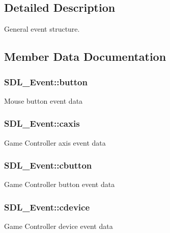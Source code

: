 \subsection{Detailed Description}
General event structure. 

\subsection{Member Data Documentation}
\hypertarget{unionSDL__Event_ab6da2fa2687e5f849f270adecc64785f}{}
\subsubsection[{button}]{ S\+D\+L\+\_\+\+Event\+::button}\label{unionSDL__Event_ab6da2fa2687e5f849f270adecc64785f}
Mouse button event data \hypertarget{unionSDL__Event_aa8f6df0f2716fae56204b12ab4a4c289}{}
\subsubsection[{caxis}]{ S\+D\+L\+\_\+\+Event\+::caxis}\label{unionSDL__Event_aa8f6df0f2716fae56204b12ab4a4c289}
Game Controller axis event data \hypertarget{unionSDL__Event_aee2b5671c8dcdb447023715cc21593cb}{}
\subsubsection[{cbutton}]{ S\+D\+L\+\_\+\+Event\+::cbutton}\label{unionSDL__Event_aee2b5671c8dcdb447023715cc21593cb}
Game Controller button event data \hypertarget{unionSDL__Event_ad3beed01e690b885728e0b0e1d636378}{}
\subsubsection[{cdevice}]{ S\+D\+L\+\_\+\+Event\+::cdevice}\label{unionSDL__Event_ad3beed01e690b885728e0b0e1d636378}
Game Controller device event data \hypertarget{unionSDL__Event_abe5cb8767f93de55163c8ddd4562a7f2}{}
